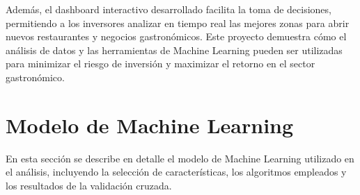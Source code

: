 \documentclass[twoside,11pt]{article}
\begin{document}
Además, el dashboard interactivo desarrollado facilita la toma de decisiones, permitiendo a los inversores analizar en tiempo real las mejores zonas para abrir nuevos restaurantes y negocios gastronómicos. Este proyecto demuestra cómo el análisis de datos y las herramientas de Machine Learning pueden ser utilizadas para minimizar el riesgo de inversión y maximizar el retorno en el sector gastronómico.


\newpage

\appendix
\section{Modelo de Machine Learning}
\label{app:modelo_ml}

En esta sección se describe en detalle el modelo de Machine Learning utilizado en el análisis, incluyendo la selección de características, los algoritmos empleados y los resultados de la validación cruzada.

\vskip 0.2in

\end{document}
